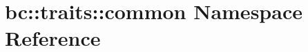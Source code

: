 \hypertarget{namespacebc_1_1traits_1_1common}{}\section{bc\+:\+:traits\+:\+:common Namespace Reference}
\label{namespacebc_1_1traits_1_1common}
